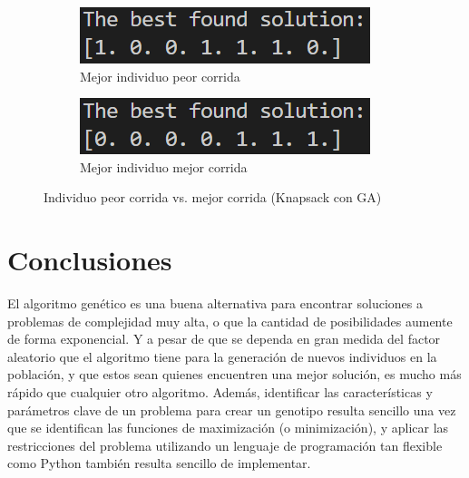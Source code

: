 \documentclass[a4paper, 12pt]{article}
\begin{document}
\begin{figure}[!ht]
    \centering
    \begin{subfigure}[b]{0.48\textwidth}
        \centering
        \includegraphics[width=\textwidth]{img/corrida_1pob.png}
        \caption{Mejor individuo peor corrida}
        \label{subfig:corrida1pob}
    \end{subfigure}
    \hfill
    \begin{subfigure}[b]{0.48\textwidth}
        \centering
        \includegraphics[width=\textwidth]{img/corrida_2pob.png}
        \caption{Mejor individuo mejor corrida}
        \label{subfig:corrida2pob}
    \end{subfigure}
    \caption{Individuo peor corrida vs. mejor corrida (Knapsack con GA)}
\end{figure}

\section{Conclusiones}
El algoritmo genético es una buena alternativa para encontrar soluciones a problemas de complejidad muy alta, o que la cantidad de posibilidades aumente de forma exponencial. Y a pesar de que se dependa en gran medida del factor aleatorio que el algoritmo tiene para la generación de nuevos individuos en la población, y que estos sean quienes encuentren una mejor solución, es mucho más rápido que cualquier otro algoritmo. Además, identificar las características y parámetros clave de un problema para crear un genotipo resulta sencillo una vez que se identifican las funciones de maximización (o minimización), y aplicar las restricciones del problema utilizando un lenguaje de programación tan flexible como Python también resulta sencillo de implementar.



\nocite{*}
\end{document}
